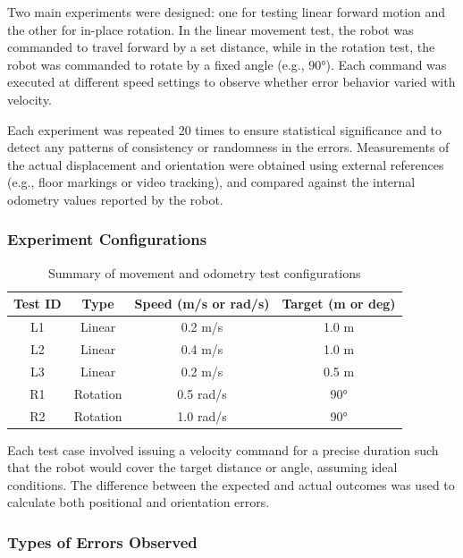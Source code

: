 \documentclass[a4paper, 12pt]{article}
\begin{document}
    Two main experiments were designed: one for testing linear forward motion and the other for in-place rotation. In the linear movement test, the robot was commanded to travel forward by a set distance, while in the rotation test, the robot was commanded to rotate by a fixed angle (e.g., 90°). Each command was executed at different speed settings to observe whether error behavior varied with velocity.

    Each experiment was repeated 20 times to ensure statistical significance and to detect any patterns of consistency or randomness in the errors. Measurements of the actual displacement and orientation were obtained using external references (e.g., floor markings or video tracking), and compared against the internal odometry values reported by the robot.

    \subsubsection*{Experiment Configurations}

    \begin{table}[H]
    \centering
    \begin{tabular}{|c|c|c|c|}
    \hline
    \textbf{Test ID} & \textbf{Type} & \textbf{Speed (m/s or rad/s)} & \textbf{Target (m or deg)} \\
    \hline
    L1 & Linear & 0.2 m/s & 1.0 m \\
    L2 & Linear & 0.4 m/s & 1.0 m \\
    L3 & Linear & 0.2 m/s & 0.5 m \\
    R1 & Rotation & 0.5 rad/s & 90° \\
    R2 & Rotation & 1.0 rad/s & 90° \\
    \hline
    \end{tabular}
    \caption{Summary of movement and odometry test configurations}
    \end{table}

    Each test case involved issuing a velocity command for a precise duration such that the robot would cover the target distance or angle, assuming ideal conditions. The difference between the expected and actual outcomes was used to calculate both positional and orientation errors.

    \subsubsection*{Types of Errors Observed}
\end{document}
